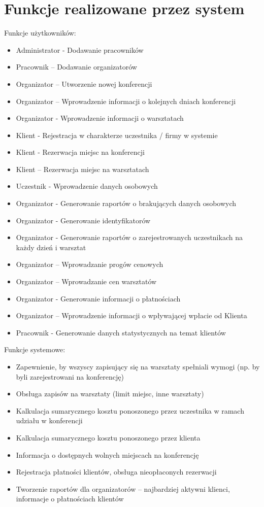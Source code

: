 \documentclass{article}
\begin{document}
\newpage
\section{Funkcje realizowane przez system}
    Funkcje użytkowników:
    \begin{itemize}
        \item Administrator - Dodawanie pracowników 
        \item Pracownik – Dodawanie organizatorów
        \item Organizator – Utworzenie nowej konferencji
        \item Organizator – Wprowadzenie informacji o kolejnych dniach konferencji
        \item Organizator - Wprowadzenie informacji o warsztatach 
        \item Klient - Rejestracja w charakterze uczestnika / firmy w systemie 
        \item Klient - Rezerwacja miejsc na konferencji 
        \item Klient – Rezerwacja miejsc na warsztatach
        \item Uczestnik - Wprowadzenie danych osobowych 
        \item Organizator - Generowanie raportów o brakujących danych osobowych 
        \item Organizator - Generowanie identyfikatorów 
        \item Organizator - Generowanie raportów o zarejestrowanych uczestnikach na każdy dzień i warsztat 
        \item Organizator – Wprowadzanie progów cenowych
        \item Organizator – Wprowadzanie cen warsztatów 
        \item Organizator  - Generowanie informacji o płatnościach 
        \item Organizator – Wprowadzenie informacji o wpływającej wpłacie od Klienta
        \item Pracownik - Generowanie danych statystycznych na temat klientów 
    \end{itemize}
    Funkcje systemowe: 
    \begin{itemize}
        \item Zapewnienie, by wszyscy zapisujący się na warsztaty spełniali wymogi (np. by byli zarejestrowani na konferencję) 
        \item Obsługa zapisów na warsztaty (limit miejsc, inne warsztaty)
        \item Kalkulacja sumarycznego kosztu ponoszonego przez uczestnika w ramach udziału w konferencji
        \item Kalkulacja sumarycznego kosztu ponoszonego przez klienta
        \item Informacja o dostępnych wolnych miejscach na konferencję 
        \item Rejestracja płatności klientów, obsługa nieopłaconych rezerwacji
        \item Tworzenie raportów dla organizatorów – najbardziej aktywni klienci, informacje o płatnościach klientów 
    \end{itemize}
\end{document}
